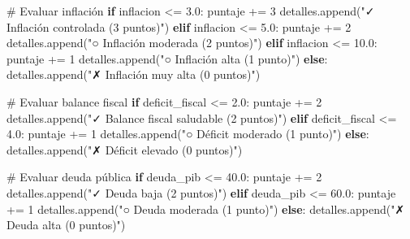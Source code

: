 \documentclass[
  doc,
  floatsintext,
  longtable,
  a4paper,
  nolmodern,
  notxfonts,
  notimes,
  12pt,
  colorlinks=true,linkcolor=blue,citecolor=blue,urlcolor=blue]{apa7}
\newenvironment{Shaded}{\begin{snugshade}}{\end{snugshade}}
\newcommand{\CommentTok}[1]{\textcolor[rgb]{0.37,0.37,0.37}{#1}}
\newcommand{\ControlFlowTok}[1]{\textcolor[rgb]{0.00,0.23,0.31}{\textbf{#1}}}
\newcommand{\DecValTok}[1]{\textcolor[rgb]{0.68,0.00,0.00}{#1}}
\newcommand{\FloatTok}[1]{\textcolor[rgb]{0.68,0.00,0.00}{#1}}
\newcommand{\NormalTok}[1]{\textcolor[rgb]{0.00,0.23,0.31}{#1}}
\newcommand{\OperatorTok}[1]{\textcolor[rgb]{0.37,0.37,0.37}{#1}}
\newcommand{\StringTok}[1]{\textcolor[rgb]{0.13,0.47,0.30}{#1}}
\begin{document}
\begin{Shaded}
\begin{Highlighting}[]
        \CommentTok{\# Evaluar inflación}
        \ControlFlowTok{if}\NormalTok{ inflacion }\OperatorTok{\textless{}=} \FloatTok{3.0}\NormalTok{:}
\NormalTok{            puntaje }\OperatorTok{+=} \DecValTok{3}
\NormalTok{            detalles.append(}\StringTok{"✓ Inflación controlada (3 puntos)"}\NormalTok{)}
        \ControlFlowTok{elif}\NormalTok{ inflacion }\OperatorTok{\textless{}=} \FloatTok{5.0}\NormalTok{:}
\NormalTok{            puntaje }\OperatorTok{+=} \DecValTok{2}
\NormalTok{            detalles.append(}\StringTok{"○ Inflación moderada (2 puntos)"}\NormalTok{)}
        \ControlFlowTok{elif}\NormalTok{ inflacion }\OperatorTok{\textless{}=} \FloatTok{10.0}\NormalTok{:}
\NormalTok{            puntaje }\OperatorTok{+=} \DecValTok{1}
\NormalTok{            detalles.append(}\StringTok{"○ Inflación alta (1 punto)"}\NormalTok{)}
        \ControlFlowTok{else}\NormalTok{:}
\NormalTok{            detalles.append(}\StringTok{"✗ Inflación muy alta (0 puntos)"}\NormalTok{)}
        
        \CommentTok{\# Evaluar balance fiscal}
        \ControlFlowTok{if}\NormalTok{ deficit\_fiscal }\OperatorTok{\textless{}=} \FloatTok{2.0}\NormalTok{:}
\NormalTok{            puntaje }\OperatorTok{+=} \DecValTok{2}
\NormalTok{            detalles.append(}\StringTok{"✓ Balance fiscal saludable (2 puntos)"}\NormalTok{)}
        \ControlFlowTok{elif}\NormalTok{ deficit\_fiscal }\OperatorTok{\textless{}=} \FloatTok{4.0}\NormalTok{:}
\NormalTok{            puntaje }\OperatorTok{+=} \DecValTok{1}
\NormalTok{            detalles.append(}\StringTok{"○ Déficit moderado (1 punto)"}\NormalTok{)}
        \ControlFlowTok{else}\NormalTok{:}
\NormalTok{            detalles.append(}\StringTok{"✗ Déficit elevado (0 puntos)"}\NormalTok{)}
        
        \CommentTok{\# Evaluar deuda pública}
        \ControlFlowTok{if}\NormalTok{ deuda\_pib }\OperatorTok{\textless{}=} \FloatTok{40.0}\NormalTok{:}
\NormalTok{            puntaje }\OperatorTok{+=} \DecValTok{2}
\NormalTok{            detalles.append(}\StringTok{"✓ Deuda baja (2 puntos)"}\NormalTok{)}
        \ControlFlowTok{elif}\NormalTok{ deuda\_pib }\OperatorTok{\textless{}=} \FloatTok{60.0}\NormalTok{:}
\NormalTok{            puntaje }\OperatorTok{+=} \DecValTok{1}
\NormalTok{            detalles.append(}\StringTok{"○ Deuda moderada (1 punto)"}\NormalTok{)}
        \ControlFlowTok{else}\NormalTok{:}
\NormalTok{            detalles.append(}\StringTok{"✗ Deuda alta (0 puntos)"}\NormalTok{)}
        

\end{Highlighting}
\end{Shaded}
\end{document}
